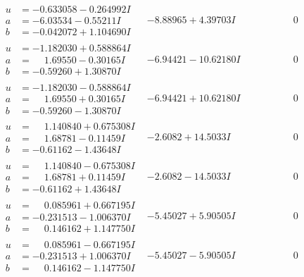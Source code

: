\documentclass[1p]{elsarticle_modified}
\theoremstyle{definition}
\begin{document}
$$\begin{array}{c|c|c}
\begin{aligned}
u &= -0.633058 - 0.264992 I \\
a &= -6.03534 - 0.55211 I \\
b &= -0.042072 + 1.104690 I\end{aligned}
 & -8.88965 + 4.39703 I & \phantom{-0.000000 } 0 \\ \hline\begin{aligned}
u &= -1.182030 + 0.588864 I \\
a &= \phantom{-}1.69550 - 0.30165 I \\
b &= -0.59260 + 1.30870 I\end{aligned}
 & -6.94421 - 10.62180 I & \phantom{-0.000000 } 0 \\ \hline\begin{aligned}
u &= -1.182030 - 0.588864 I \\
a &= \phantom{-}1.69550 + 0.30165 I \\
b &= -0.59260 - 1.30870 I\end{aligned}
 & -6.94421 + 10.62180 I & \phantom{-0.000000 } 0 \\ \hline\begin{aligned}
u &= \phantom{-}1.140840 + 0.675308 I \\
a &= \phantom{-}1.68781 - 0.11459 I \\
b &= -0.61162 - 1.43648 I\end{aligned}
 & -2.6082 + 14.5033 I & \phantom{-0.000000 } 0 \\ \hline\begin{aligned}
u &= \phantom{-}1.140840 - 0.675308 I \\
a &= \phantom{-}1.68781 + 0.11459 I \\
b &= -0.61162 + 1.43648 I\end{aligned}
 & -2.6082 - 14.5033 I & \phantom{-0.000000 } 0 \\ \hline\begin{aligned}
u &= \phantom{-}0.085961 + 0.667195 I \\
a &= -0.231513 - 1.006370 I \\
b &= \phantom{-}0.146162 + 1.147750 I\end{aligned}
 & -5.45027 + 5.90505 I & \phantom{-0.000000 } 0 \\ \hline\begin{aligned}
u &= \phantom{-}0.085961 - 0.667195 I \\
a &= -0.231513 + 1.006370 I \\
b &= \phantom{-}0.146162 - 1.147750 I\end{aligned}
 & -5.45027 - 5.90505 I & \phantom{-0.000000 } 0 \\ \hline\begin{aligned}

\end{aligned}
\end{array}$$
\end{document}
